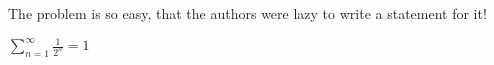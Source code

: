 The problem is so easy, that the authors were lazy to write a statement for it!

$\sum_{n=1}^\infty\frac1{2^n} = 1$